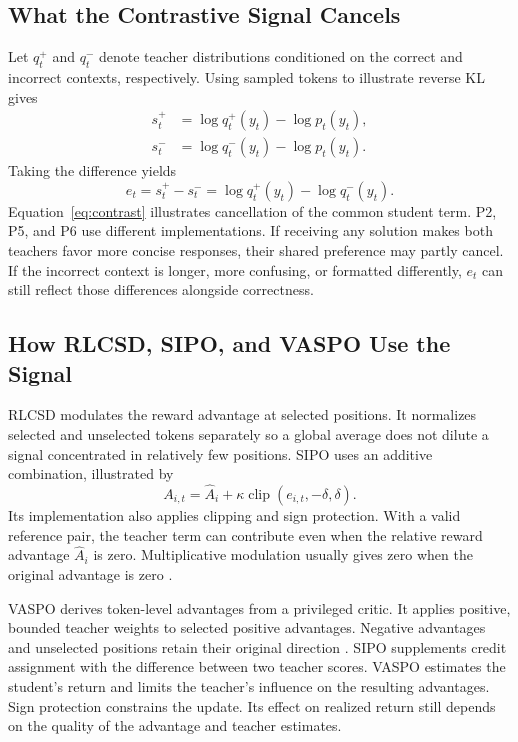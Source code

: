 \documentclass[11pt,a4paper]{article}
\begin{document}
\subsection{What the Contrastive Signal Cancels}
Let \(q_t^+\) and \(q_t^-\) denote teacher distributions conditioned on the correct and incorrect contexts, respectively. Using sampled tokens to illustrate reverse KL gives
\begin{equation}
\begin{aligned}
s_t^+&=\log q_t^+(y_t)-\log p_t(y_t),\\
s_t^-&=\log q_t^-(y_t)-\log p_t(y_t).
\end{aligned}
\end{equation}
Taking the difference yields
\begin{equation}
e_t=s_t^+-s_t^-=\log q_t^+(y_t)-\log q_t^-(y_t).
\label{eq:contrast}
\end{equation}
Equation~\eqref{eq:contrast} illustrates cancellation of the common student term. P2, P5, and P6 use different implementations. If receiving any solution makes both teachers favor more concise responses, their shared preference may partly cancel. If the incorrect context is longer, more confusing, or formatted differently, \(e_t\) can still reflect those differences alongside correctness.

\subsection{How RLCSD, SIPO, and VASPO Use the Signal}
RLCSD modulates the reward advantage at selected positions. It normalizes selected and unselected tokens separately so a global average does not dilute a signal concentrated in relatively few positions. SIPO uses an additive combination, illustrated by
\begin{equation}
A_{i,t}=\widehat A_i+\kappa\operatorname{clip}(e_{i,t},-\delta,\delta).
\label{eq:sipo}
\end{equation}
Its implementation also applies clipping and sign protection. With a valid reference pair, the teacher term can contribute even when the relative reward advantage \(\widehat A_i\) is zero. Multiplicative modulation usually gives zero when the original advantage is zero \cite{p2,p6}.

VASPO derives token-level advantages from a privileged critic. It applies positive, bounded teacher weights to selected positive advantages. Negative advantages and unselected positions retain their original direction \cite{p9}. SIPO supplements credit assignment with the difference between two teacher scores. VASPO estimates the student's return and limits the teacher's influence on the resulting advantages. Sign protection constrains the update. Its effect on realized return still depends on the quality of the advantage and teacher estimates.
\end{document}
